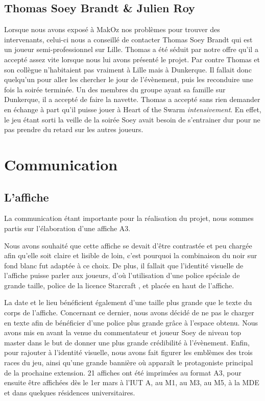 \subsection{Thomas \og Soey \fg{} Brandt \& Julien Roy}%
\label{sub:thomas_soey_brandt_&_julien_roy}

Lorsque nous avons exposé à MakOz nos problèmes pour trouver des intervenants,
celui-ci nous a conseillé de contacter Thomas \og Soey \fg{} Brandt qui
est un joueur semi-professionnel sur Lille. Thomas a été séduit par
notre offre qu'il a accepté assez vite lorsque nous lui avons présenté
le projet. Par contre Thomas et son collègue n'habitaient pas vraiment à
Lille mais à Dunkerque. Il fallait donc quelqu'un pour aller les
chercher le jour de l'évènement, puis les reconduire une fois la soirée
terminée. Un des membres du groupe ayant sa famille sur Dunkerque, il a
accepté de faire la navette. Thomas a accepté sans rien demander en
échange à part qu'il puisse jouer à Heart of the Swarm
\emph{intensivement}.
En effet, le jeu étant sorti la veille de la soirée Soey avait besoin
de s'entrainer dur pour ne pas prendre du retard sur les autres joueurs.


\section{Communication}%
\label{sec:communication}

\subsection{L'affiche}%
\label{sub:l_affiche}

La communication étant importante pour la réalisation du projet, nous sommes partis sur l'élaboration
d'une affiche A3.

Nous avons souhaité que cette affiche se devait d’être contrastée et peu chargée afin qu’elle soit
claire et lisible de loin, c’est pourquoi la combinaison du noir sur fond blanc fut adaptée à ce choix.
De plus, il fallait que l’identité visuelle de l’affiche puisse parler aux joueurs, d’où l’utilisation
d’une police spéciale de grande taille, police de la licence \og Starcraft \fg{}, et placée en haut de l’affiche.

La date et le lieu bénéficient également d’une taille plus grande que le texte du corps de l’affiche.
Concernant ce dernier, nous avons décidé de ne pas le charger en texte afin de bénéficier d’une police
plus grande grâce à l’espace obtenu.
Nous avons mis en avant la venue du commentateur et joueur Soey de niveau \og top master \fg{} dans le but
de donner une plus grande crédibilité à l’évènement.
Enfin, pour rajouter à l’identité visuelle, nous avons fait figurer les emblèmes des trois races du jeu,
ainsi qu’une grande bannière où apparaît le protagoniste principal de la prochaine extension.
21 affiches ont été imprimées au format A3, pour ensuite être affichées dès le 1er mars à l’IUT A, au M1,
au M3, au M5, à la MDE et dans quelques résidences universitaires.

